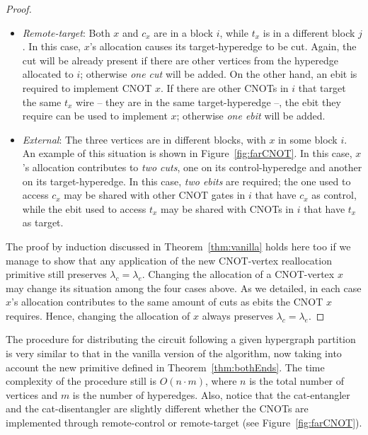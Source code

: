 \begin{proof}
\begin{itemize}
  \item \textit{Remote-target}: Both \(x\) and \(c_x\) are in a block \(i\), while \(t_x\) is in a different block \(j\). In this case, \(x\)'s allocation causes its target-hyperedge to be cut. Again, the cut will be already present if there are other vertices from the hyperedge allocated to \(i\); otherwise \textit{one cut} will be added. On the other hand, an ebit is required to implement CNOT \(x\). If there are other CNOTs in \(i\) that target the same \(t_x\) wire -- they are in the same target-hyperedge --, the ebit they require can be used to implement \(x\); otherwise \textit{one ebit} will be added.

  \item \textit{External}: The three vertices are in different blocks, with \(x\) in some block \(i\). An example of this situation is shown in Figure~\ref{fig:farCNOT}. In this case, \(x\)'s allocation contributes to \textit{two cuts}, one on its control-hyperedge and another on its target-hyperedge. In this case, \textit{two ebits} are required; the one used to access \(c_x\) may be shared with other CNOT gates in \(i\) that have \(c_x\) as control, while the ebit used to access \(t_x\) may be shared with CNOTs in \(i\) that have \(t_x\) as target.
\end{itemize} 

The proof by induction discussed in Theorem~\ref{thm:vanilla} holds here too if we manage to show that any application of the new CNOT-vertex reallocation primitive still preserves \(\lambda_c = \lambda_e\). Changing the allocation of a CNOT-vertex \(x\) may change its situation among the four cases above. As we detailed, in each case \(x\)'s allocation contributes to the same amount of cuts as ebits the CNOT \(x\) requires. Hence, changing the allocation of \(x\) always preserves \(\lambda_c = \lambda_e\).

\end{proof}



The procedure for distributing the circuit following a given hypergraph partition is very similar to that in the vanilla version of the algorithm, now taking into account the new primitive defined in Theorem~\ref{thm:bothEnds}. The time complexity of the procedure still is \(O(n\cdot m)\), where \(n\) is the total number of vertices and \(m\) is the number of hyperedges. Also, notice that the cat-entangler and the cat-disentangler are slightly different whether the CNOTs are implemented through remote-control or remote-target (see Figure~\ref{fig:farCNOT}).

